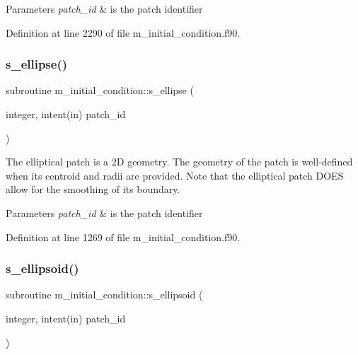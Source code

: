 \begin{DoxyParams}{Parameters}
{\em patch\+\_\+id} & is the patch identifier \\
\hline
\end{DoxyParams}


Definition at line 2290 of file m\+\_\+initial\+\_\+condition.\+f90.

\mbox{\label{namespacem__initial__condition_a5e999ad19f23f5f2b059b80e49c0a086}} 
\subsubsection{\texorpdfstring{s\+\_\+ellipse()}{s\_ellipse()}}
{\footnotesize\ttfamily subroutine m\+\_\+initial\+\_\+condition\+::s\+\_\+ellipse (\begin{DoxyParamCaption}\item[{integer, intent(in)}]{patch\+\_\+id }\end{DoxyParamCaption})}



The elliptical patch is a 2D geometry. The geometry of the patch is well-\/defined when its centroid and radii are provided. Note that the elliptical patch D\+O\+ES allow for the smoothing of its boundary. 


\begin{DoxyParams}{Parameters}
{\em patch\+\_\+id} & is the patch identifier \\
\hline
\end{DoxyParams}


Definition at line 1269 of file m\+\_\+initial\+\_\+condition.\+f90.

\mbox{\label{namespacem__initial__condition_a524f37de8423b7943c22c5d105eda922}} 
\subsubsection{\texorpdfstring{s\+\_\+ellipsoid()}{s\_ellipsoid()}}
{\footnotesize\ttfamily subroutine m\+\_\+initial\+\_\+condition\+::s\+\_\+ellipsoid (\begin{DoxyParamCaption}\item[{integer, intent(in)}]{patch\+\_\+id }\end{DoxyParamCaption})}



